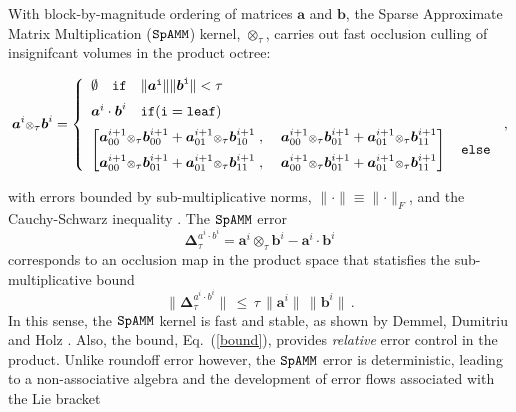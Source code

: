 \documentclass[letterpaper,twocolumn,amsmath,amsfont,amssymb,english,aps,jcp,preprintnumbers,groupaddress,nofootinbib,tightenlines]{revtex4}
\newcommand{\mat}[1]{\boldsymbol{#1}}
\newcommand{\ot}{ {\scriptstyle \otimes}_{ \tau } }
\begin{document}
With block-by-magnitude ordering of matrices $\mat{a}$ and $\mat{b}$, 
the Sparse Approximate Matrix Multiplication ($\tt SpAMM$) kernel,  $\ot$, carries out fast 
occlusion culling of insignifcant volumes in the product octree:
\begin{widetext}
\begin{equation}
\mat{a}^{i} \ot \mat{b}^{i} = 
\left\{
        \begin{array}{ll}
                 \emptyset \quad \tt{if}\quad \lVert \mat{a}^i \rVert \lVert \mat{b}^i \rVert < \tau \\[0.2cm]
                 \mat{a} ^i \cdot \mat{b}^i \quad  \tt{if}(i=\tt{leaf}) \\[0.2cm]
\begin{bmatrix} \mat{a}^{i+1}_{00} \ot \mat{b}^{i+1}_{00} +\mat{a}^{i+1}_{01} \ot \mat{b}^{i+1}_{10} \; , \; &
                \mat{a}^{i+1}_{00} \ot \mat{b}^{i+1}_{01} +\mat{a}^{i+1}_{01} \ot \mat{b}^{i+1}_{11}  \\[0.2cm] 
                \mat{a}^{i+1}_{00} \ot \mat{b}^{i+1}_{01} +\mat{a}^{i+1}_{01} \ot \mat{b}^{i+1}_{11} \; , \; & 
                \mat{a}^{i+1}_{00} \ot \mat{b}^{i+1}_{01} +\mat{a}^{i+1}_{01} \ot \mat{b}^{i+1}_{11}   
\end{bmatrix}  \quad \tt{else}
                \end{array}
              \right.  \, ,
\end{equation}
\end{widetext}
with errors bounded by sub-multiplicative norms, $\lVert \cdot \rVert \equiv \lVert \cdot \rVert_F$, and the Cauchy-Schwarz inequality \cite{kahan}.
The $\tt SpAMM$ error 
\begin{equation}
\mat{\Delta}^{a^i\cdot b^i}_{\tau}=\mat{a}^i \ot \mat{b}^i-\mat{a}^i\cdot \mat{b}^i 
\end{equation}
corresponds to an occlusion map in the product space that statisfies the sub-multiplicative bound 
\begin{equation}\label{bound}
\lVert \mat{\Delta}^{a^i \cdot b^i}_{\tau} \rVert \, \leq \, \tau \, \lVert \mat{a}^i \rVert  \,  \lVert \mat{b}^i \rVert \, .
\end{equation}
In this sense, the $\tt SpAMM$ kernel is fast and stable,  as shown by Demmel, Dumitriu and Holz \cite{Demmel07}. Also,
the bound,  Eq.~(\ref{bound}), provides {\em relative} error control in the product.  
Unlike roundoff error however, the $\tt SpAMM$ error is deterministic,
leading to a non-associative algebra and the development of error flows associated with the Lie bracket
\end{document}
